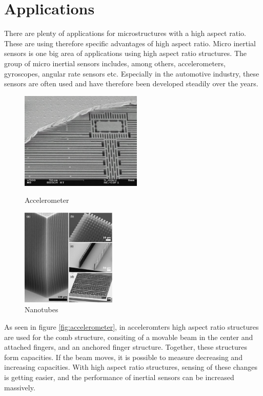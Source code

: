 \documentclass[a4paper,
  twoside, %
  headlines=2.1 %
  ]{scrartcl}
\begin{document}
\section{Applications}
There are plenty of applications for microstructures with a high aspect ratio. These are using therefore specific advantages of high aspect ratio. Micro inertial sensors is one big area of applications using high aspect ratio structures. The group of micro inertial sensors includes, among others, accelerometers, gyroscopes, angular rate sensors etc. Especially in the automotive industry, these sensors are often used and have therefore been developed steadily over the years.
\begin{figure}[H]
    \centering
    \begin{minipage}{.5\textwidth}
        \centering
        \includegraphics[height = 175px]{Graphics/Accelerometer.png}
        \caption{Accelerometer \cite{sensors2018}}
        \label{fig:accelerometer}
    \end{minipage}%
    \begin{minipage}{0.5\textwidth}
        \centering
        \includegraphics[height = 175px]{Graphics/nanotubes.png}
        \caption{Nanotubes \cite{hutchison2010}}
        \label{fig:nanotubes}
    \end{minipage}
\end{figure}
As seen in figure \ref{fig:accelerometer}, in acceleromters high aspect ratio structures are used for the comb structure, consiting of a movable beam in the center and attached fingers, and an anchored finger structure. Together, these structures form capacities. If the beam moves, it is possible to measure decreasing and increasing capacities. With high aspect ratio structures, sensing of these changes is getting easier, and the performance of inertial sensors can be increased massively.
\end{document}
